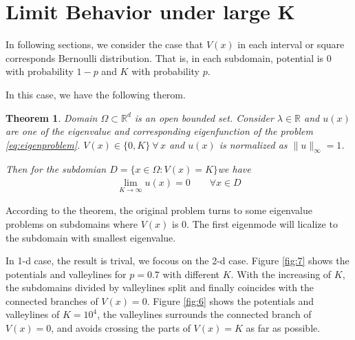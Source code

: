 \documentclass[12pt,a4paper]{article}
\newtheorem{theorem}{Theorem}
\begin{document}
\section{Limit Behavior under large K}\label{sec:limit}

In following sections, we consider the case that $V(x)$ in each interval or square corresponds Bernoulli distribution. That is, in each subdomain, potential is $0$ with probability $1-p$ and $K$ with probability $p$.

In this case, we have the following therom.
\begin{theorem}\label{th:largeK}
Domain $\Omega \subset \mathbb{R}^d$ is an open bounded set. Consider $\lambda \in \mathbb{R}$ and $u(x)$ are one of the eigenvalue and corresponding eigenfunction of the problem \ref{eq:eigenproblem}. $V(x) \in \{0, K\} \ \forall \, x$ and $u(x)$ is normalized as $\|u\|_{\infty} = 1$.

Then for the subdomian $D = \{x \in \Omega: V(x) = K\}$we have
\begin{align}\label{eq:largeK}
\lim_{K \rightarrow \infty} u(x) = 0 \qquad \forall x \in D
\end{align}
\end{theorem}

According to the theorem, the original problem turns to some eigenvalue problems on subdomains where $V(x)$ is $0$. The first eigenmode will licalize to the subdomain with smallest eigenvalue.

In 1-d case, the result is trival, we focous on the 2-d case. Figure \ref{fig:7} shows the potentials and valleylines for $p = 0.7$ with different $K$. With the increasing of $K$, the subdomains divided by valleylines split and finally coincides with the connected branches of $V(x) = 0$. Figure \ref{fig:6} shows the potentials and valleylines of $K = 10^4$, the valleylines surrounds the connected branch of $V(x) = 0$, and avoids crossing the parts of $V(x) = K$ as far as possible.
\end{document}
